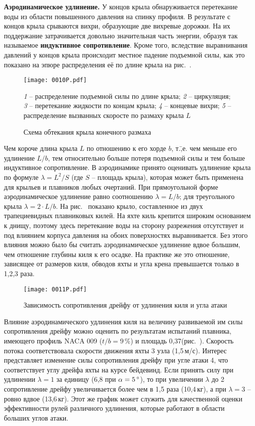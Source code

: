 \textbf{Аэродинамическое удлинение.} У концов крыла обнаруживается перетекание воды из области повышенного давления на спинку профиля. В результате с концов крыла срываются вихри, образующие две вихревые дорожки. На их поддержание затрачивается довольно значительная часть энергии, образуя так называемое \textbf{индуктивное сопротивление}. Кроме того, вследствие выравнивания давлений у концов крыла происходит местное падение подъемной силы, как это показано на эпюре распределения её по длине крыла на рис.~. 

\begin{figure*}[htb]
  \centering
  \texttt{[image: 0010P.pdf]}
  \caption{Схема обтекания крыла конечного размаха}
  \label{fig:10}
  \centering
  \small
  \textit{1} \--- распределение подъемной силы по длине крыла;
  \textit{2} \--- циркуляция;
  \textit{3} \--- перетекание жидкости по концам крыла;
  \textit{4} \--- концевые вихри;
  \textit{5} \--- распределение вызванных скоросте по размаху крыла $L$
\end{figure*}

Чем короче длина крыла $L$ по отношению к его хорде $b$, т.\=,е. чем меньше его удлинение $L/b$, тем относительно больше потеря подъемной силы и тем больше индуктивное сопротивление. В аэродинамике принято оценивать удлинение крыла по формуле $\lambda = L^2/S$ (где $S$ \--- площадь крыла), которая может быть применена для крыльев и плавников любых очертаний. При прямоугольной форме аэродинамическое удлинение равно соотношению $\lambda = L / b$; для треугольного крыла $\lambda = 2 \cdot L / b$.
На рис.~ показано крыло, составленное из двух трапециевидных плавниковых килей. На яхте киль крепится широким основанием к днищу, поэтому здесь перетекание воды на сторону разрежения отсутствует и под влиянием корпуса давления на обоих поверхностях выравнивается. Без этого влияния можно было бы считать аэродинамическое удлинение вдвое большим, чем отношение глубины киля к его осадке. На практике же это отношение, зависящее от размеров киля, обводов яхты и угла крена превышается только в 1,2,3 раза.

\begin{figure}[htb]
  \centering
  \texttt{[image: 0011P.pdf]}
  \caption{Зависимость сопротивления дрейфу от удлинения киля и угла атаки}
  \label{fig:11}
\end{figure}

Влияние аэродинамического удлинения киля на величину развиваемой им силы сопротивления дрейфу  можно оценить по результатам испытаний плавника, имеющего профиль NACA 009 ($t/b = 9\,\%$) и площадь 0,37\msq (рис.~). Скорость потока соответствовала скорости движения яхты 3 узла (1,5\,м/с). Интерес представляет изменение силы сопротивления дрейфу при угле атаки 4\gr, что соответствует углу дрейфа яхты на курсе бейдевинд. Если принять силу  при удлинении $\lambda = 1$ за единицу (6,8 при $\alpha = 5\,^\circ$), то при увеличении $\lambda$ до 2 сопротивление дрейфу увеличивается более чем в 1,5 раза (10,4\,кг), а при $\lambda = 3$ \--- ровно вдвое (13,6\,кг). Этот же график может служить для качественной оценки эффективности рулей различного удлинения, которые работают в области больших углов атаки.

